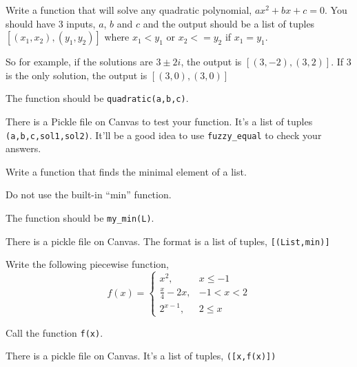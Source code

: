 \documentclass[11pt,letterpaper]{article}
\begin{document}
\begin{problem}
 Write a function that will solve any quadratic polynomial, $ax^2+bx+c=0$. You should have 3 inputs, 
$a$, $b$ and $c$ and the output should be a list of tuples $[(x_1,x_2),(y_1,y_2)]$ where $x_1<y_1$
or $x_2<=y_2$ if $x_1=y_1$. 

So for example, if the solutions are $3\pm 2i$, the output is $[(3,-2),(3,2)]$. If $3$ is the 
only solution, the output is $[(3,0),(3,0)]$

The function should be \texttt{quadratic(a,b,c)}.

There is a Pickle file on Canvas to test your function. It's a list of tuples \texttt{(a,b,c,sol1,sol2)}. It'll be a good idea to use \texttt{fuzzy\_equal} to check your answers.
\end{problem}


\begin{problem}
Write a function that finds the minimal element of a list.

Do not use the built-in ``min'' function. 

The function should be \texttt{my\_min(L)}.

There is a pickle file on Canvas. The format is a list of tuples,
\texttt{[(List,min)]}
\end{problem}


\begin{problem}
Write the following piecewise function,
\[
f(x) = \left\{\begin{array}{ll} x^2, & x\le-1 \\ \frac{x}{4}-2x, & -1<x<2 \\ 2^{x-1}, & 2\le x \end{array}\right.
\]

Call the function \texttt{f(x)}.

There is a pickle file on Canvas. It's a list of tuples, \texttt{([x,f(x)])}

\end{problem}
\end{document}
